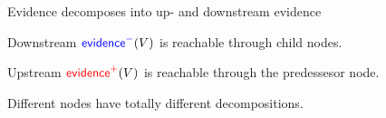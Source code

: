 \documentclass[landscape,footrule]{foils}
\newcommand{\EVPOS}{\textcolor{red}{\mathsf{evidence}^+}}
\newcommand{\EVNEG}{\textcolor{blue}{\mathsf{evidence}^-}}
\begin{document}
\centerline{
\hspace*{1cm}
}

\begin{triangles}
\item Evidence decomposes into up- and downstream evidence
\item Downstream $\EVNEG(V)$ is reachable through child nodes.
\item Upstream $\EVPOS(V)$ is reachable through the predessesor node.
\item Different nodes have totally different decompositions.
\end{triangles}
\end{document}
